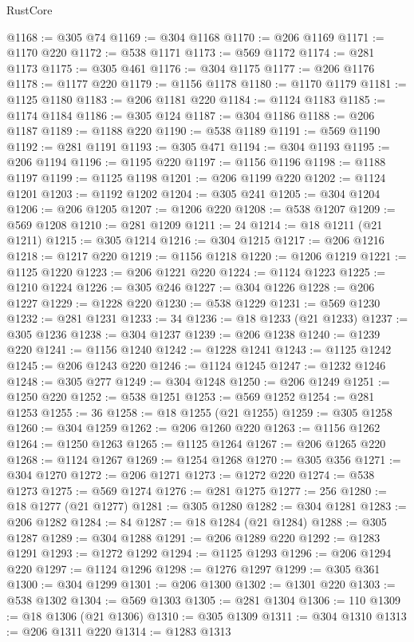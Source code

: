 \begin{lexlean}{RustCore}
\begin{coremodule}
@1168 := @305 @74
@1169 := @304 @1168
@1170 := @206 @1169
@1171 := @1170 @220
@1172 := @538 @1171
@1173 := @569 @1172
@1174 := @281 @1173
@1175 := @305 @461
@1176 := @304 @1175
@1177 := @206 @1176
@1178 := @1177 @220
@1179 := @1156 @1178
@1180 := @1170 @1179
@1181 := @1125 @1180
@1183 := @206 @1181 @220
@1184 := @1124 @1183
@1185 := @1174 @1184
@1186 := @305 @124
@1187 := @304 @1186
@1188 := @206 @1187
@1189 := @1188 @220
@1190 := @538 @1189
@1191 := @569 @1190
@1192 := @281 @1191
@1193 := @305 @471
@1194 := @304 @1193
@1195 := @206 @1194
@1196 := @1195 @220
@1197 := @1156 @1196
@1198 := @1188 @1197
@1199 := @1125 @1198
@1201 := @206 @1199 @220
@1202 := @1124 @1201
@1203 := @1192 @1202
@1204 := @305 @241
@1205 := @304 @1204
@1206 := @206 @1205
@1207 := @1206 @220
@1208 := @538 @1207
@1209 := @569 @1208
@1210 := @281 @1209
@1211 := 24
@1214 := @18 @1211 (@21 @1211)
@1215 := @305 @1214
@1216 := @304 @1215
@1217 := @206 @1216
@1218 := @1217 @220
@1219 := @1156 @1218
@1220 := @1206 @1219
@1221 := @1125 @1220
@1223 := @206 @1221 @220
@1224 := @1124 @1223
@1225 := @1210 @1224
@1226 := @305 @246
@1227 := @304 @1226
@1228 := @206 @1227
@1229 := @1228 @220
@1230 := @538 @1229
@1231 := @569 @1230
@1232 := @281 @1231
@1233 := 34
@1236 := @18 @1233 (@21 @1233)
@1237 := @305 @1236
@1238 := @304 @1237
@1239 := @206 @1238
@1240 := @1239 @220
@1241 := @1156 @1240
@1242 := @1228 @1241
@1243 := @1125 @1242
@1245 := @206 @1243 @220
@1246 := @1124 @1245
@1247 := @1232 @1246
@1248 := @305 @277
@1249 := @304 @1248
@1250 := @206 @1249
@1251 := @1250 @220
@1252 := @538 @1251
@1253 := @569 @1252
@1254 := @281 @1253
@1255 := 36
@1258 := @18 @1255 (@21 @1255)
@1259 := @305 @1258
@1260 := @304 @1259
@1262 := @206 @1260 @220
@1263 := @1156 @1262
@1264 := @1250 @1263
@1265 := @1125 @1264
@1267 := @206 @1265 @220
@1268 := @1124 @1267
@1269 := @1254 @1268
@1270 := @305 @356
@1271 := @304 @1270
@1272 := @206 @1271
@1273 := @1272 @220
@1274 := @538 @1273
@1275 := @569 @1274
@1276 := @281 @1275
@1277 := 256
@1280 := @18 @1277 (@21 @1277)
@1281 := @305 @1280
@1282 := @304 @1281
@1283 := @206 @1282
@1284 := 84
@1287 := @18 @1284 (@21 @1284)
@1288 := @305 @1287
@1289 := @304 @1288
@1291 := @206 @1289 @220
@1292 := @1283 @1291
@1293 := @1272 @1292
@1294 := @1125 @1293
@1296 := @206 @1294 @220
@1297 := @1124 @1296
@1298 := @1276 @1297
@1299 := @305 @361
@1300 := @304 @1299
@1301 := @206 @1300
@1302 := @1301 @220
@1303 := @538 @1302
@1304 := @569 @1303
@1305 := @281 @1304
@1306 := 110
@1309 := @18 @1306 (@21 @1306)
@1310 := @305 @1309
@1311 := @304 @1310
@1313 := @206 @1311 @220
@1314 := @1283 @1313

\end{coremodule}
\end{lexlean}
